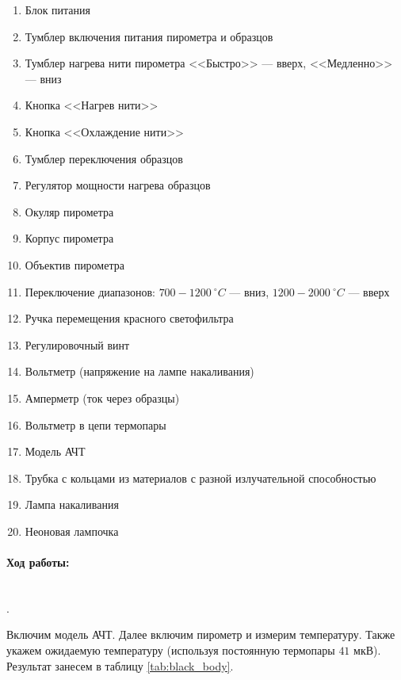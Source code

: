\documentclass[a4paper, 12pt]{article}
\newcommand{\parag}[1]{\paragraph*{#1:}}
\newcounter{Points}
\newcommand{\point}{\arabic{Points}. \addtocounter{Points}{1}}
\begin{document}
\begin{enumerate}
    \item Блок питания
    \item Тумблер включения питания пирометра и образцов
    \item Тумблер нагрева нити пирометра <<Быстро>> --- вверх, <<Медленно>> --- вниз
    \item Кнопка <<Нагрев нити>>
    \item Кнопка <<Охлаждение нити>>
    \item Тумблер переключения образцов
    \item Регулятор мощности нагрева образцов
    \item Окуляр пирометра
    \item Корпус пирометра
    \item Объектив пирометра
    \item Переключение диапазонов: $700-1200 ~^\circ C$ --- вниз, $1200-2000 ~^\circ C$ --- вверх
    \item Ручка перемещения красного светофильтра
    \item Регулировочный винт
    \item Вольтметр (напряжение на лампе накаливания)
    \item Амперметр (ток через образцы)
    \item Вольтметр в цепи термопары
    \item Модель АЧТ
    \item Трубка с кольцами из материалов с разной излучательной способностью
    \item Лампа накаливания
    \item Неоновая лампочка
\end{enumerate}



\parag {Ход работы} ~\\
\point Включим модель АЧТ. Далее включим пирометр и измерим температуру. Также укажем ожидаемую температуру (используя постоянную термопары $41$ мкВ). Результат занесем в таблицу \ref{tab:black_body}.
\end{document}
